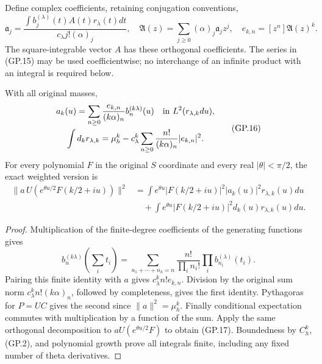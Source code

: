 Define complex coefficients, retaining conjugation conventions,
\begin{equation}
 \mathfrak a_j=\frac{\int b_j^{(\lambda)}(t)A(t)r_\lambda(t)dt}
                         {c_\lambda j!(\alpha)_j},\quad
 \mathfrak A(z)=\sum_{j\geq0}(\alpha)_j\mathfrak a_jz^j,\quad
 e_{k,n}=[z^n]\mathfrak A(z)^k.
 \tag{GP.15}
\end{equation}
The square-integrable vector $A$ has these orthogonal coefficients.
The series in (GP.15) may be used coefficientwise; no interchange of
an infinite product with an integral is required below.
\begin{theorem}
With all original masses,
\begin{equation}
 \begin{gathered}
 a_k(u)=\sum_{n\geq0}\frac{e_{k,n}}{(k\alpha)_n}b_n^{(k\lambda)}(u)
       \quad\hbox{in }L^2(r_{\lambda,k}du),\\
 \int d_k r_{\lambda,k}
  =\mu_h^k-c_\lambda^k\sum_{n\geq0}
                         \frac{n!}{(k\alpha)_n}|e_{k,n}|^2.
 \end{gathered}
 \tag{GP.16}
\end{equation}
For every polynomial $F$ in the original $S$ coordinate and every
real $|\theta|<\pi/2$, the exact weighted version is
\begin{equation}
 \begin{aligned}
 \|a\,U(e^{\theta u/2}F(k/2+iu))\|^2
 &=\int e^{\theta u}|F(k/2+iu)|^2|a_k(u)|^2r_{\lambda,k}(u)du\\
 &\quad+\int e^{\theta u}|F(k/2+iu)|^2d_k(u)r_{\lambda,k}(u)du.
 \end{aligned}
 \tag{GP.17}
\end{equation}
\end{theorem}
\begin{proof}
Multiplication of the finite-degree coefficients of the generating
functions gives
\[
 b_n^{(k\lambda)}(\textstyle\sum_i t_i)
 =\sum_{n_1+\cdots+n_k=n}\frac{n!}{\prod_i n_i!}
                                \prod_i b_{n_i}^{(\lambda)}(t_i).
\]
Pairing this finite identity with $a$ gives
$c_\lambda^kn!e_{k,n}$. Division by the original sum norm
$c_\lambda^kn!(k\alpha)_n$, followed by completeness, gives the
first identity. Pythagoras for $P=UC$ gives the second since
$\|a\|^2=\mu_h^k$. Finally conditional expectation commutes with
multiplication by a function of the sum. Apply the same orthogonal
decomposition to $aU(e^{\theta u/2}F)$ to obtain (GP.17).
Boundedness by $C_h^k$, (GP.2), and polynomial growth prove all
integrals finite, including any fixed number of theta derivatives.
\end{proof}

